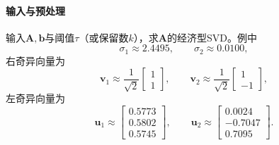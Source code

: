 \paragraph{输入与预处理}
输入$\bm A,\bm b$与阈值$\tau$（或保留数$k$），求$\bm A$的经济型SVD。例中
\[
 \sigma_1\approx2.4495,\qquad \sigma_2\approx0.0100,
\]
右奇异向量为
\[
 \bm v_1\approx\frac1{\sqrt2}\begin{bmatrix}1\\1\end{bmatrix},\qquad
 \bm v_2\approx\frac1{\sqrt2}\begin{bmatrix}1\\-1\end{bmatrix},
\]
左奇异向量为
\[
 \bm u_1\approx\begin{bmatrix}0.5773\\0.5802\\0.5745\end{bmatrix},\qquad
 \bm u_2\approx\begin{bmatrix}0.0024\\-0.7047\\0.7095\end{bmatrix}.
\]

